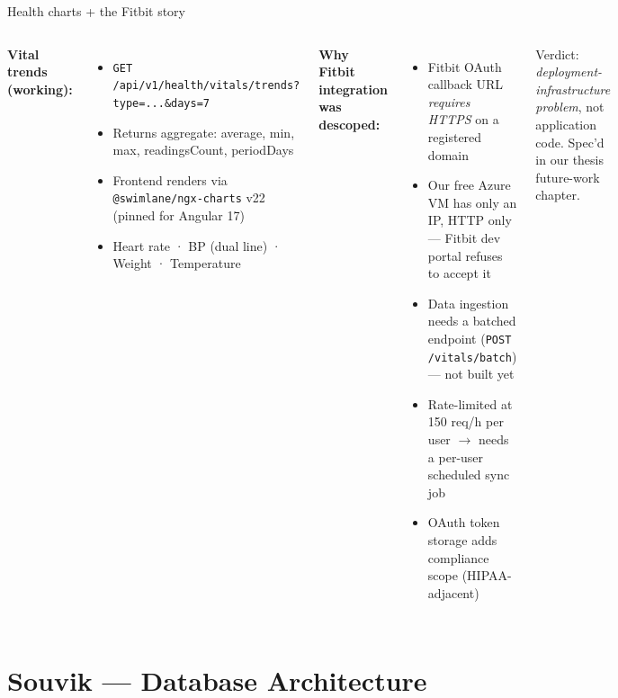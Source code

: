 \documentclass[aspectratio=169,11pt]{beamer}
\begin{document}
\begin{frame}{Health charts + the Fitbit story}
  \begin{columns}[T]
    \footnotesize
    \textbf{Vital trends (working):}
    \begin{itemize}
      \item \texttt{GET /api/v1/health/vitals/trends?type=...\&days=7}
      \item Returns aggregate: average, min, max, readingsCount, periodDays
      \item Frontend renders via \texttt{@swimlane/ngx-charts} v22 (pinned for Angular 17)
      \item Heart rate · BP (dual line) · Weight · Temperature
    \end{itemize}
    \footnotesize
    \textbf{Why Fitbit integration was descoped:}
    \begin{itemize}
      \item Fitbit OAuth callback URL \emph{requires HTTPS} on a registered domain
      \item Our free Azure VM has only an IP, HTTP only --- Fitbit dev portal refuses to accept it
      \item Data ingestion needs a batched endpoint (\texttt{POST /vitals/batch}) --- not built yet
      \item Rate-limited at 150 req/h per user $\rightarrow$ needs a per-user scheduled sync job
      \item OAuth token storage adds compliance scope (HIPAA-adjacent)
    \end{itemize}
    \vspace{2pt}
    \alert{Verdict:} \emph{deployment-infrastructure problem}, not application code. Spec'd in our thesis future-work chapter.
  \end{columns}
\end{frame}

\section{Souvik --- Database Architecture}
\end{document}
